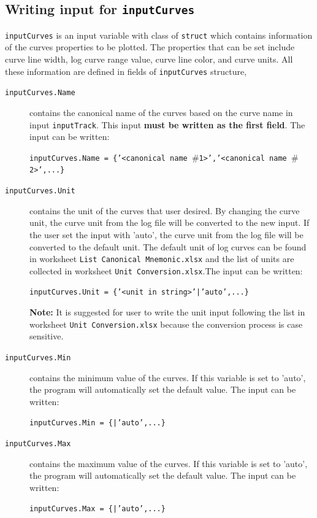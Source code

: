 \documentclass[12pt,a4paper,oneside]{report}
\begin{document}
\subsection{Writing input for \texttt{inputCurves}}
\texttt{inputCurves} is an input variable with class of \texttt{struct} which contains information of the curves properties to be plotted. The properties that can be set include curve line width, log curve range value, curve line color, and curve units. All these information are defined in fields of \texttt{inputCurves} structure,
\begin{description}
\item[\texttt{inputCurves.Name}] contains the canonical name of the curves based on the curve name in input \texttt{inputTrack}. This input \textbf{must be written as the first field}. The input can be written:

\texttt{inputCurves.Name = \{'<canonical name $\#$1>','<canonical name $\#$2>',...\}}

\item[\texttt{inputCurves.Unit}] contains the unit of the curves that user desired. By changing the curve unit, the curve unit from the log file will be converted to the new input. If the user set the input with 'auto', the curve unit from the log file will be converted to the default unit. The default unit of log curves can be found in worksheet \texttt{List Canonical Mnemonic.xlsx} and the list of units are collected in worksheet \texttt{Unit Conversion.xlsx}.The input can be written:

\texttt{inputCurves.Unit = \{'<unit in string>'|'auto',...\}}


\noindent\textbf{Note:} It is suggested for user to write the unit input following the list in  worksheet \texttt{Unit Conversion.xlsx} because the conversion process is case sensitive.

\item[\texttt{inputCurves.Min}] contains the minimum value of the curves. If this variable is set to 'auto', the program will automatically set the default value. The input can be written:

\texttt{inputCurves.Min = \{<numeric value>|'auto',...\}}

\item[\texttt{inputCurves.Max}] contains the maximum value of the curves. If this variable is set to 'auto', the program will automatically set the default value. The input can be written:

\texttt{inputCurves.Max = \{<numeric value>|'auto',...\}}


\end{description}
\end{document}
